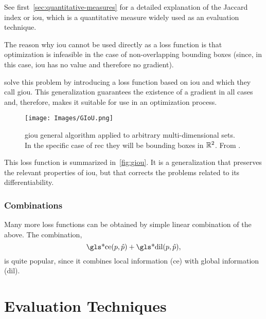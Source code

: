 See first\ \vref{sec:quantitative-measures} for a detailed explanation of the
Jaccard index or \gls{iou}, which is a quantitative
measure widely used as an evaluation technique.

\begin{remarkBox}
  The reason why \gls{iou} cannot be used directly as a loss function is that
  optimization is infeasible in the case of non-overlapping bounding
  boxes (since, in this case, \gls{iou} has no value and
  therefore no gradient).
\end{remarkBox}

 solve this problem by introducing a loss function
based on \gls{iou} and which they call \gls{giou}. This generalization
guarantees the existence of a gradient in all cases and, therefore, makes it
suitable for use in an optimization process.

\begin{figure}[ht]
  \centering
  \texttt{[image: Images/GIoU.png]}
  \caption[ algorithm]{\acf{giou} general algorithm applied
    to arbitrary multi-dimensional sets. In the specific case of \gls{rec} they
    will be bounding boxes in \(\mathbb{R}^2\). From
    .}%
  \label{fig:giou}
\end{figure}

This loss function is summarized in\ \vref{fig:giou}. It is a generalization
that preserves the relevant properties of \gls{iou}, but that corrects the
problems related to its differentiability.

\subsubsection{Combinations}

Many more loss functions can be obtained by simple linear combination of the
above. The combination,
\begin{equation}
  \text{\gls*{ce}}(p, \hat{p}) + \text{\gls*{dil}}(p, \hat{p}),
\end{equation}
is quite popular, since it combines local information (\gls{ce}) with global
information (\gls{dil}).



\section{Evaluation Techniques}\label{sec:eval-measure}

